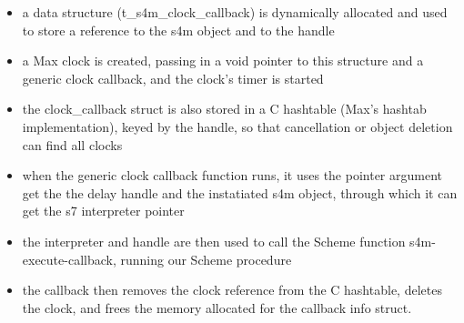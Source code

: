 \documentclass[acmsmall]{acmart}
\begin{document}
\begin{itemize}
\item a data structure (t\_s4m\_clock\_callback) is dynamically allocated and used to store a
reference to the s4m object and to the handle
\item a Max clock is created, passing in a void pointer to this structure
  and a generic clock callback, and the clock's timer is started
\item the clock\_callback struct is also stored in a C hashtable (Max's hashtab implementation),
  keyed by the handle, so that cancellation or object deletion can find all clocks
\item when the generic clock callback function runs, it uses the pointer argument get the
  the delay handle and the instatiated s4m object, through which it 
  can get the s7 interpreter pointer 
\item the interpreter and handle are then used to call the Scheme function
  s4m-execute-callback, running our Scheme procedure
\item the callback then removes the clock reference from the C hashtable,
  deletes the clock, and frees the memory allocated for the callback info struct.
\end{itemize}
\end{document}
